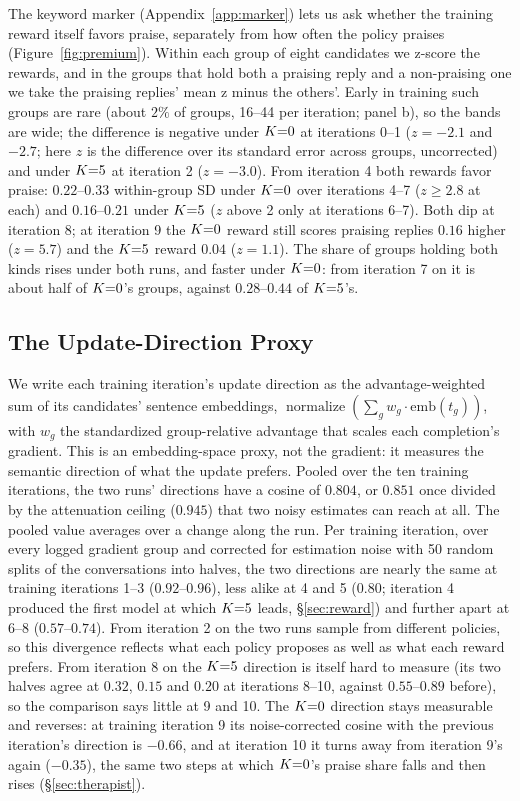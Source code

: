 The keyword marker (Appendix~\ref{app:marker}) lets us ask whether the training reward itself favors
praise, separately from how often the policy praises (Figure~\ref{fig:premium}). Within each
group of eight candidates we z-score the rewards, and in the groups that hold both a praising reply
and a non-praising one we take the praising replies' mean z minus the others'. Early in training
such groups are rare (about $2\%$ of groups, 16--44 per iteration; panel b), so the bands are wide;
the difference is negative under $K{=}0$ at iterations 0--1 ($z = -2.1$ and $-2.7$; here $z$ is the
difference over its standard error across groups, uncorrected) and under $K{=}5$ at iteration 2
($z = -3.0$). From iteration 4 both rewards favor praise: $0.22$--$0.33$ within-group SD under
$K{=}0$ over iterations 4--7 ($z \geq 2.8$ at each) and $0.16$--$0.21$ under
$K{=}5$ ($z$ above 2 only at iterations 6--7). Both dip at iteration 8; at iteration 9 the $K{=}0$
reward still scores praising replies $0.16$ higher ($z = 5.7$) and the $K{=}5$ reward $0.04$ ($z = 1.1$). The share of groups
holding both kinds rises under both runs, and faster under $K{=}0$: from iteration 7 on it is about
half of $K{=}0$'s groups, against $0.28$--$0.44$ of $K{=}5$'s.

\subsection{The Update-Direction Proxy}
\label{app:direction}

We write each training iteration's update direction as the advantage-weighted sum of its
candidates' sentence embeddings, $\operatorname{normalize}(\sum_g w_g \cdot \mathrm{emb}(t_g))$,
with $w_g$ the standardized group-relative advantage that scales each completion's gradient. This
is an embedding-space proxy, not the gradient: it measures the semantic direction of what the
update prefers. Pooled over the ten training iterations, the two runs' directions have a cosine of
$0.804$, or $0.851$ once divided by the attenuation ceiling ($0.945$) that two noisy estimates can
reach at all. The pooled value averages over a change along the run. Per training iteration, over
every logged gradient group and corrected for estimation noise with 50 random splits of the
conversations into halves, the two directions are nearly the same at training iterations 1--3
($0.92$--$0.96$), less alike at 4 and 5 ($0.80$; iteration 4 produced the first model at which
$K{=}5$ leads, \S\ref{sec:reward}) and further apart at 6--8 ($0.57$--$0.74$). From iteration 2 on
the two runs sample from different policies, so this divergence reflects what each policy
proposes as well as what each reward prefers. From iteration 8 on the $K{=}5$ direction is itself
hard to measure (its two halves agree at $0.32$, $0.15$ and $0.20$ at iterations 8--10, against
$0.55$--$0.89$ before), so the comparison says little at 9 and 10. The $K{=}0$ direction stays
measurable and reverses: at training iteration 9 its noise-corrected cosine with the previous
iteration's direction is $-0.66$, and at iteration 10 it turns away from iteration 9's again
($-0.35$), the same two steps at which $K{=}0$'s praise share falls and then rises
(\S\ref{sec:therapist}).

